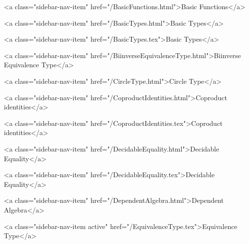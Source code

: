       
    
      
        
          <a class="sidebar-nav-item" href="/BasicFunctions.html">Basic Functions</a>
        
      
    
      
        
          <a class="sidebar-nav-item" href="/BasicTypes.html">Basic Types</a>
        
      
    
      
        
          <a class="sidebar-nav-item" href="/BasicTypes.tex">Basic Types</a>
        
      
    
      
        
          <a class="sidebar-nav-item" href="/BiinverseEquivalenceType.html">Biinverse Equivalence Type</a>
        
      
    
      
        
          <a class="sidebar-nav-item" href="/CircleType.html">Circle Type</a>
        
      
    
      
        
          <a class="sidebar-nav-item" href="/CoproductIdentities.html">Coproduct identities</a>
        
      
    
      
        
          <a class="sidebar-nav-item" href="/CoproductIdentities.tex">Coproduct identities</a>
        
      
    
      
        
          <a class="sidebar-nav-item" href="/DecidableEquality.html">Decidable Equality</a>
        
      
    
      
        
          <a class="sidebar-nav-item" href="/DecidableEquality.tex">Decidable Equality</a>
        
      
    
      
        
          <a class="sidebar-nav-item" href="/DependentAlgebra.html">Dependent Algebra</a>
        
      
    
      
        
          <a class="sidebar-nav-item active" href="/EquivalenceType.tex">Equivalence Type</a>
        
